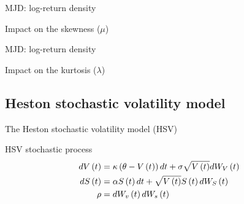 \documentclass{beamer}
\newcommand{\Bmsub}[1]{W_{#1}\left(t\right)}
\newcommand{\St}{S\left(t\right)}
\newcommand{\Vt}{V\left(t\right)}
\newcommand{\HSVstock}{
  d\St &= \alpha \St dt + \sqrt{\Vt} \St d \Bmsub{S}
}
\newcommand{\HSVvol}{
  d\Vt &= \kappa\left(\theta - \Vt \right) dt + \sigma \sqrt{\Vt} d \Bmsub{V}
}
\begin{document}
\begin{frame}{MJD: log-return density}

\begin{block}{Impact on the skewness ($\mu$)}
\begin{figure}[h]
\centering

\end{figure}
\end{block}
\end{frame}

\begin{frame}{MJD: log-return density}
\begin{block}{Impact on the kurtosis ($\lambda$)}
\begin{figure}[h]
\centering

\end{figure}
\end{block}
 
\end{frame}




















\subsection{Heston stochastic volatility model}
\begin{frame}{The Heston stochastic volatility model (HSV)}

\begin{block}{HSV stochastic process}
\begin{align}
    \HSVvol \notag\\
    \HSVstock \notag \\
    \rho  &= d\Bmsub{v} d\Bmsub{s}  \notag
\end{align}
  
\end{block}


\end{frame}
\end{document}
